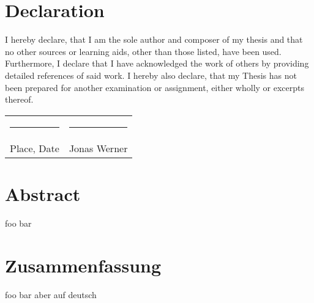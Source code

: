 \documentclass[11pt, a4paper, BCOR=10mm, ngerman, oneside]{scrbook}
\begin{document}
\pagebreak

\chapter*{Declaration}

I hereby declare, that I am the sole author and composer of my thesis and that no other sources or learning aids, other than those listed, have been used. Furthermore, I declare that I have acknowledged the work of others by providing detailed references of said work.  \newline
I hereby also declare, that my Thesis has not been prepared for another examination
or assignment, either wholly or excerpts thereof.
\\[3\normalbaselineskip]
\begin{tabular}{p{} l}
  \rule{0.33\textwidth}{0.4pt}   &   \rule{0.33\textwidth}{0.4pt} \\
  Place, Date                  &   Jonas Werner
\end{tabular}

\chapter*{Abstract}
foo bar

\chapter*{Zusammenfassung}
foo bar aber auf deutsch



\tableofcontents


\mainmatter
\end{document}
